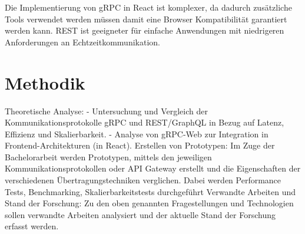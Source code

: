 Die Implementierung von gRPC in React ist komplexer, da dadurch zusätzliche
Tools verwendet werden müssen damit eine Browser Kompatibilität garantiert
werden kann. REST ist geeigneter für einfache Anwendungen mit niedrigeren
Anforderungen an Echtzeitkommunikation.

\section{Methodik}
Theoretische Analyse:
- Untersuchung und Vergleich der Kommunikationsprotokolle gRPC und REST/GraphQL
in Bezug auf Latenz, Effizienz und Skalierbarkeit.
- Analyse von gRPC-Web zur Integration in Frontend-Architekturen (in React).
Erstellen von Prototypen:
Im Zuge der Bachelorarbeit werden Prototypen, mittels den jeweiligen Kommunikationsprotokollen
oder API Gateway erstellt und die Eigenschaften der verschiedenen
Übertragungstechniken verglichen. Dabei werden Performance Tests, Benchmarking,
Skalierbarkeitstests durchgeführt
Verwandte Arbeiten und Stand der Forschung:
Zu den oben genannten Fragestellungen und Technologien sollen verwandte Arbeiten
analysiert und der aktuelle Stand der Forschung erfasst werden.


\chapterend
